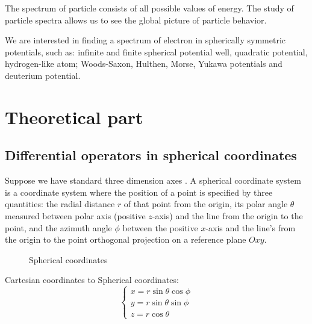 \documentclass[a4paper, 12pt]{article}
\begin{document}
The spectrum of particle consists of all possible values of energy. The study of particle spectra allows us to see the global picture of particle behavior. 


We are interested in finding a spectrum of electron in spherically symmetric potentials, such as: infinite and finite spherical potential well, quadratic potential, hydrogen-like atom; Woods-Saxon, Hulthen, Morse, Yukawa potentials and deuterium potential.


\section{Theoretical part}
\subsection{Differential operators in spherical coordinates}\label{dif_op_3d}


Suppose we have standard three dimension axes . A spherical coordinate system is a coordinate system where the position of a point is specified by three quantities: the radial distance $r$ of that point from the origin, its polar angle $\theta$ measured between polar axis (positive $z$-axis) and the line from the origin to the point, and the azimuth angle $\phi$ between the positive $x$-axis  and the line's from the origin to the point orthogonal projection on a reference plane $Oxy$.


%
%
\begin{figure}[h!]
\begin{center}
\end{center}
\caption{Spherical coordinates}
\end{figure}
Cartesian coordinates to Spherical coordinates:
\begin{equation} \label{sph_coord}
\begin{cases}
	{x}= {r} \sin{\theta}\cos{\phi} \\
	{y} = {r} \sin{\theta}\sin{\phi} \\
	{z} = {r}\cos{\theta}
\end{cases}
\end{equation}
\end{document}

